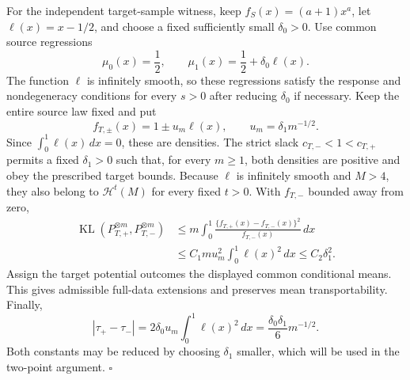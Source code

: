 For the independent target-sample witness, keep \(f_S(x)=(a+1)x^a\), let \(\ell(x)=x-1/2\), and choose a fixed sufficiently small \(\delta_0>0\). Use common source regressions
\[
\mu_0(x)=\frac12,
\qquad
\mu_1(x)=\frac12+\delta_0\ell(x).
\]
The function \(\ell\) is infinitely smooth, so these regressions satisfy the response and nondegeneracy conditions for every \(s>0\) after reducing \(\delta_0\) if necessary. Keep the entire source law fixed and put
\[
f_{T,\pm}(x)=1\pm u_m\ell(x),
\qquad
u_m=\delta_1m^{-1/2}.
\]
Since \(\int_0^1\ell(x)\,dx=0\), these are densities. The strict slack \(c_{T,-}<1<c_{T,+}\) permits a fixed \(\delta_1>0\) such that, for every \(m\ge1\), both densities are positive and obey the prescribed target bounds. Because \(\ell\) is infinitely smooth and \(M>4\), they also belong to \(\mathcal H^t(M)\) for every fixed \(t>0\). With \(f_{T,-}\) bounded away from zero,
\[
\begin{aligned}
\operatorname{KL}(P_{T,+}^{\otimes m},P_{T,-}^{\otimes m})
&\le m\int_0^1
\frac{\{f_{T,+}(x)-f_{T,-}(x)\}^2}{f_{T,-}(x)}\,dx\\
&\le C_1mu_m^2\int_0^1\ell(x)^2\,dx
\le C_2\delta_1^2.
\end{aligned}
\]
Assign the target potential outcomes the displayed common conditional means. This gives admissible full-data extensions and preserves mean transportability. Finally,
\[
\left|\tau_+-\tau_-\right|
=2\delta_0u_m\int_0^1\ell(x)^2\,dx
=\frac{\delta_0\delta_1}{6}m^{-1/2}.
\]
Both constants may be reduced by choosing \(\delta_1\) smaller, which will be used in the two-point argument. \(\square\)